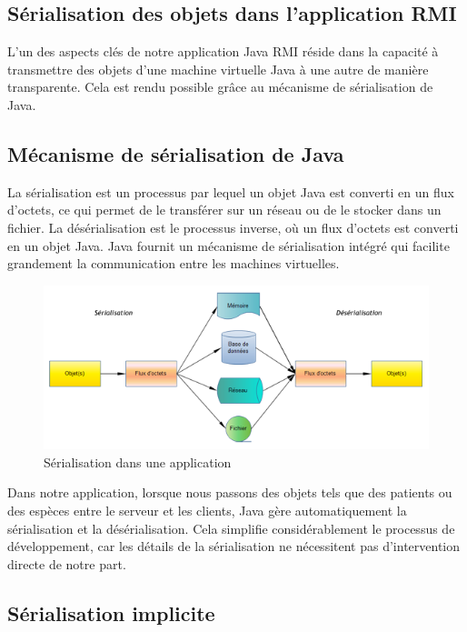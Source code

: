 \documentclass{article} %
\begin{document}
\subsection{Sérialisation des objets dans l'application RMI}

L'un des aspects clés de notre application Java RMI réside dans la
capacité à transmettre des objets d'une machine virtuelle Java à une autre de
manière transparente. Cela est rendu possible grâce au mécanisme de sérialisation de Java.

\subsection{Mécanisme de sérialisation de Java}

La sérialisation est un processus par lequel un objet Java est converti en un flux d'octets,
ce qui permet de le transférer sur un réseau ou de le stocker dans un fichier.
La désérialisation est le processus inverse, où un flux d'octets est converti en un objet Java.
Java fournit un mécanisme de sérialisation intégré qui facilite grandement la communication entre
les machines virtuelles.

\begin{figure}[h]
    \centering
    \includegraphics[width=1\textwidth]{serialisation}
    \caption{Sérialisation dans une application}
    \label{fig:serialisation}
\end{figure}

Dans notre application, lorsque nous passons des objets tels que des patients
ou des espèces entre le serveur et les clients,
Java gère automatiquement la sérialisation et la désérialisation. Cela simplifie considérablement
le processus de développement, car les détails de la sérialisation ne nécessitent pas
d'intervention directe de notre part.

\subsection{Sérialisation implicite}
\end{document}
